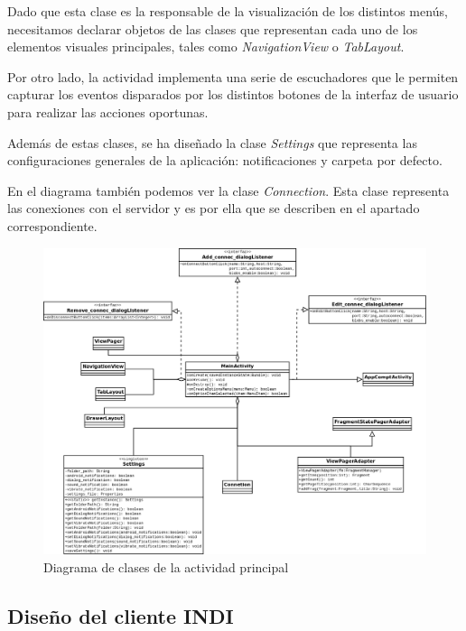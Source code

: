 \bigskip
Dado que esta clase es la responsable de la visualización de los distintos menús, necesitamos declarar objetos de las clases que representan cada uno de los elementos visuales principales, tales como \textit{NavigationView}\cite{HTMMDND} o \textit{TabLayout}\cite{ATLWSV}.

\bigskip
Por otro lado, la actividad implementa una serie de escuchadores que le permiten capturar los eventos disparados por los distintos botones de la interfaz de usuario para realizar las acciones oportunas.

\bigskip
Además de estas clases, se ha diseñado la clase \textit{Settings} que representa las configuraciones generales de la aplicación: notificaciones y carpeta por defecto.

\bigskip
En el diagrama también podemos ver la clase \textit{Connection}. Esta clase representa las conexiones con el servidor y es por ella que se describen en el apartado correspondiente.


\bigskip
\begin{figure}[!ht]
  \begin{center}
  \includegraphics[width=1\textwidth]{../images/main_activity.png}
  \caption{Diagrama de clases de la actividad principal}
  \label{fig:diag_main_activity}
  \end{center}
\end{figure}


\newpage
\subsection{Diseño del cliente INDI}


